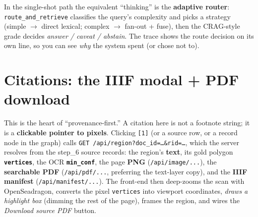 \documentclass[11pt]{article}
\newcommand{\code}[1]{\texttt{#1}}
\begin{document}
\FloatBarrier

In the single-shot path the equivalent ``thinking'' is the \textbf{adaptive
router}: \code{route\_and\_retrieve} classifies the query's complexity and picks
a strategy (simple $\to$ direct lexical; complex $\to$ fan-out + fuse), then the
CRAG-style grade decides \emph{answer / caveat / abstain}. The trace shows the
route decision on its own line, so you can see \emph{why} the system spent (or
chose not to).

\section{Citations: the IIIF modal + PDF download}

This is the heart of ``provenance-first.'' A citation here is not a footnote
string; it is a \textbf{clickable pointer to pixels}. Clicking \texttt{[1]} (or a
source row, or a record node in the graph) calls
\code{GET /api/region?doc\_id=\dots\&rid=\dots}, which the server resolves from
the step\_6 source records: the region's \textbf{text}, its gold polygon
\textbf{\code{vertices}}, the OCR \textbf{\code{min\_conf}}, the page \textbf{PNG}
(\code{/api/image/...}), the \textbf{searchable PDF} (\code{/api/pdf/...},
preferring the text-layer copy), and the \textbf{IIIF manifest}
(\code{/api/manifest/...}). The front-end then deep-zooms the scan with
OpenSeadragon, converts the pixel \code{vertices} into viewport coordinates,
\emph{draws a highlight box} (dimming the rest of the page), frames the region,
and wires the \emph{Download source PDF} button.
\end{document}
